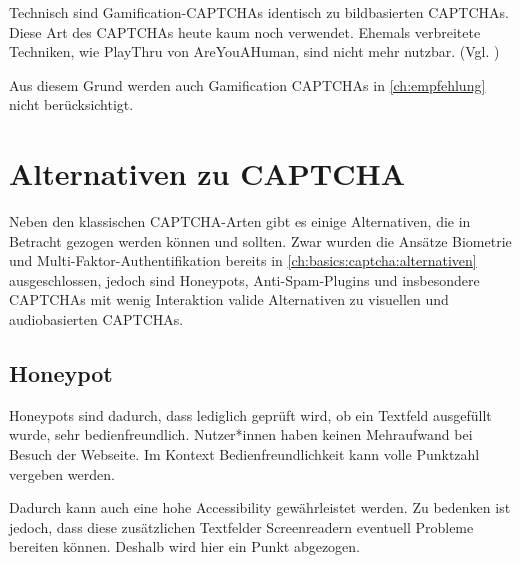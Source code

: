 Technisch sind Gamification-CAPTCHAs identisch zu bildbasierten CAPTCHAs.
Diese Art des CAPTCHAs heute kaum noch verwendet.
Ehemals verbreitete Techniken, wie PlayThru von AreYouAHuman, sind nicht mehr nutzbar. (Vgl. \cite{ivan})

Aus diesem Grund werden auch Gamification CAPTCHAs in \autoref{ch:empfehlung} nicht berücksichtigt.


\section{Alternativen zu CAPTCHA}
Neben den klassischen CAPTCHA-Arten gibt es einige Alternativen, die in Betracht gezogen werden können und sollten.
Zwar wurden die Ansätze Biometrie und Multi-Faktor-Authentifikation bereits in \autoref{ch:basics:captcha:alternativen}
ausgeschlossen, jedoch sind Honeypots, Anti-Spam-Plugins und insbesondere CAPTCHAs mit wenig Interaktion valide Alternativen 
zu visuellen und audiobasierten CAPTCHAs. 

\subsection{Honeypot}
Honeypots sind dadurch, dass lediglich geprüft wird, ob ein Textfeld ausgefüllt wurde, sehr bedienfreundlich.
Nutzer*innen haben keinen Mehraufwand bei Besuch der Webseite. 
Im Kontext Bedienfreundlichkeit kann volle Punktzahl vergeben werden.

Dadurch kann auch eine hohe Accessibility gewährleistet werden. 
Zu bedenken ist jedoch, dass diese zusätzlichen Textfelder Screenreadern eventuell Probleme bereiten können.
Deshalb wird hier ein Punkt abgezogen.

